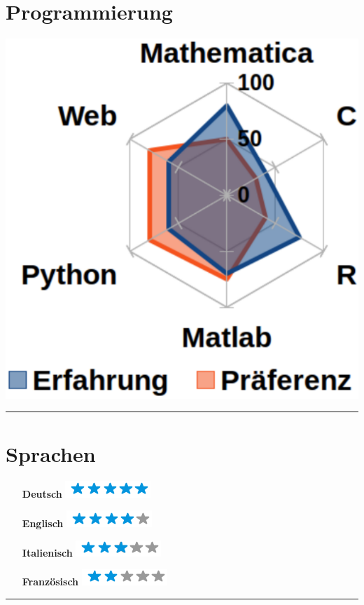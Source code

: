 \documentclass{article}
\begin{document}
\begin{minipage}[t]{0.3\textwidth}
    \section*{\fontsize{18pt}{24pt}\selectfont \color{pblue} Programmierung}
	\vspace{-2mm}
	\includegraphics[scale=0.3]{../img/programmierung.pdf}
	\vspace{2mm}
	\hrule
	\vspace{-2mm}
	\section*{\fontsize{18pt}{24pt}\selectfont \color{pblue} Sprachen}
	\vspace{-2mm}
	\begin{itemize}
	\centering
	\item[\textbf{Deutsch}] \includegraphics[scale=0.50]{../img/5stars.png}\vspace{-2mm}
	\item[\textbf{Englisch}]  \includegraphics[scale=0.50]{../img/4stars.png}\vspace{-2mm}
    \item[\textbf{Italienisch}] \includegraphics[scale=0.5]{../img/3stars.png}\vspace{-2mm}
    \item[\textbf{Französisch}]  \includegraphics[scale=0.50]{../img/2stars.png}
    \end{itemize}
	\hrule
	\vspace{-2mm}

\end{minipage}
\end{document}
